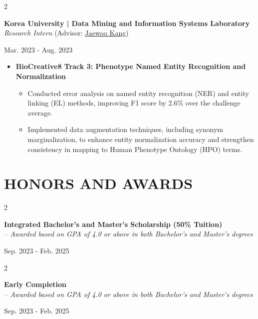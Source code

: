 \documentclass[10pt, letterpaper]{article}
\newenvironment{highlights}{
    \begin{itemize}[
        topsep=0.10 cm,
        parsep=0.10 cm,
        partopsep=0pt,
        itemsep=0pt,
        leftmargin=0 cm + 10pt
    ]
}{
    \end{itemize}
} %
\newenvironment{twocolentry}[2][]{
    \onecolentry
    \def\secondColumn{#2}
    \setcolumnwidth{\fill, 3.5 cm}
    \begin{paracol}{2}
}{
    \switchcolumn \raggedleft \secondColumn
    \end{paracol}
    \endonecolentry
} %
\begin{document}
         \vspace{0.3 cm}       
        \begin{twocolentry}{
            Mar. 2023 - Aug. 2023\\ 
        }
        \textbf{Korea University | Data Mining and Information Systems Laboratory} \\
        \textit{Research Intern} (Advisor: \href{https://scholar.google.co.kr/citations?user=RaBZafQAAAAJ&hl=ko}{Jaewoo Kang})
        \end{twocolentry}
        \vspace{0.2 cm}
\begin{highlights}
    \item \textbf{BioCreative8 Track 3: Phenotype Named Entity Recognition and Normalization}
    \vspace{-0.1 cm}
    \begin{highlights}
    \item Conducted error analysis on named entity recognition (NER) and entity linking (EL) methods, improving F1 score by 2.6\% over the challenge average.
    \item Implemented data augmentation techniques, including synonym marginalization, to enhance entity normalization accuracy and strengthen consistency in mapping to Human Phenotype Ontology (HPO) terms.
    \end{highlights}
\end{highlights}
            \vspace{0.2 cm}
\section{HONORS AND AWARDS}
            \vspace{0.2 cm}
        \begin{twocolentry}
        {
            Sep. 2023 - Feb. 2025
        }
        {
        \textbf{Integrated Bachelor's and Master's Scholarship (50\% Tuition)}\\
        \textit{– Awarded based on GPA of 4.0 or above in both Bachelor's and Master's degrees
}
        }
        \end{twocolentry}

    \vspace{0.2 cm}
        \begin{twocolentry}
        {
            Sep. 2023 - Feb. 2025
        }
        {
        \textbf{Early Completion} \\
        \textit{– Awarded based on GPA of 4.0 or above in both Bachelor's and Master's degrees
}
        }
        \end{twocolentry}
\end{document}
